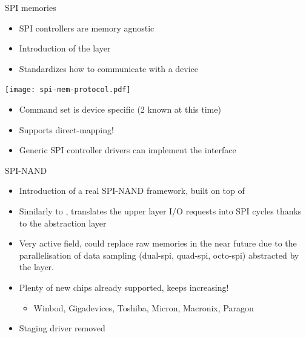 \documentclass[aspectratio=169,obeyspaces,spaces,hyphens,dvipsnames]{beamer}
\begin{document}
\begin{frame}{SPI memories}
  \begin{itemize}
  \item SPI controllers are memory agnostic
  \item Introduction of the  layer
  \item Standardizes how to communicate with a device
  \end{itemize}
  \vfill
  \texttt{[image: spi-mem-protocol.pdf]}
  \vfill
  \begin{itemize}
  \item Command set is device specific (2 known at this time)
  \item Supports direct-mapping!
  \item Generic SPI controller drivers can implement the
     interface
  \end{itemize}
\end{frame}

\begin{frame}{SPI-NAND}
  \begin{itemize}
  \item Introduction of a real SPI-NAND framework, built on top of
  \item Similarly to , translates the upper layer
    I/O requests into SPI cycles thanks to the  abstraction
    layer
    \vfill
  \item Very active field, could replace raw memories in the near future
    due to the parallelisation of data sampling (dual-spi, quad-spi,
    octo-spi) abstracted by the  layer.
  \item Plenty of new chips already supported, keeps increasing!
    \begin{itemize}
    \item Winbod, Gigadevices, Toshiba, Micron, Macronix, Paragon
    \end{itemize}
    \vfill
  \item Staging  driver removed
  \end{itemize}
\end{frame}
\end{document}
